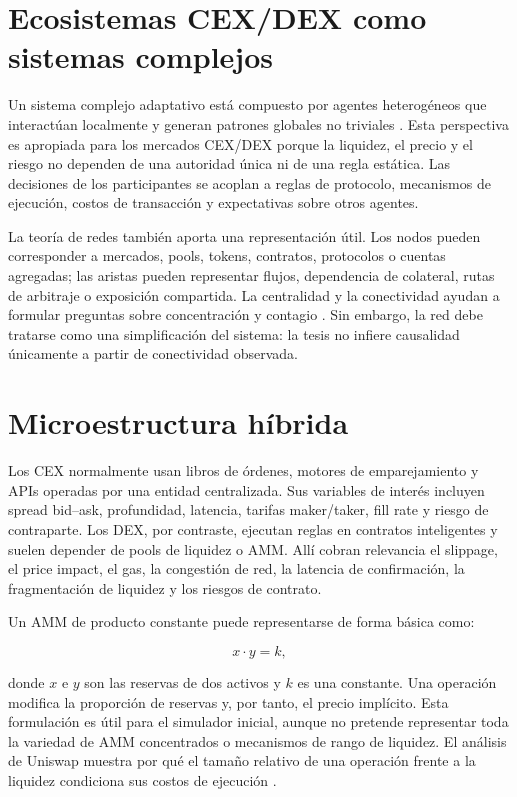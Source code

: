 \section{Ecosistemas CEX/DEX como sistemas complejos}

Un sistema complejo adaptativo está compuesto por agentes heterogéneos que interactúan localmente y generan patrones globales no triviales \cite{holland1995hidden}. Esta perspectiva es apropiada para los mercados CEX/DEX porque la liquidez, el precio y el riesgo no dependen de una autoridad única ni de una regla estática. Las decisiones de los participantes se acoplan a reglas de protocolo, mecanismos de ejecución, costos de transacción y expectativas sobre otros agentes.

La teoría de redes también aporta una representación útil. Los nodos pueden corresponder a mercados, pools, tokens, contratos, protocolos o cuentas agregadas; las aristas pueden representar flujos, dependencia de colateral, rutas de arbitraje o exposición compartida. La centralidad y la conectividad ayudan a formular preguntas sobre concentración y contagio \cite{barabasi2016network}. Sin embargo, la red debe tratarse como una simplificación del sistema: la tesis no infiere causalidad únicamente a partir de conectividad observada.

\section{Microestructura híbrida}

Los CEX normalmente usan libros de órdenes, motores de emparejamiento y APIs operadas por una entidad centralizada. Sus variables de interés incluyen spread bid--ask, profundidad, latencia, tarifas maker/taker, fill rate y riesgo de contraparte. Los DEX, por contraste, ejecutan reglas en contratos inteligentes y suelen depender de pools de liquidez o AMM. Allí cobran relevancia el slippage, el price impact, el gas, la congestión de red, la latencia de confirmación, la fragmentación de liquidez y los riesgos de contrato.

Un AMM de producto constante puede representarse de forma básica como:

\begin{equation}
  x \cdot y = k,
\end{equation}

donde $x$ e $y$ son las reservas de dos activos y $k$ es una constante. Una operación modifica la proporción de reservas y, por tanto, el precio implícito. Esta formulación es útil para el simulador inicial, aunque no pretende representar toda la variedad de AMM concentrados o mecanismos de rango de liquidez. El análisis de Uniswap muestra por qué el tamaño relativo de una operación frente a la liquidez condiciona sus costos de ejecución \cite{angeris2020uniswap}.

